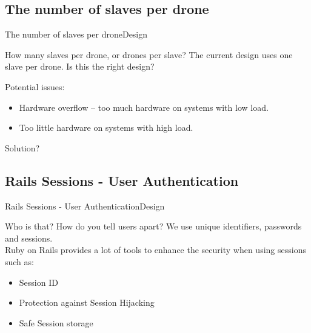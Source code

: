 \subsection{The number of slaves per drone}
\begin{frame}{The number of slaves per drone}{Design}
  \begin{block}{How many slaves per drone, or drones per slave?}
	The current design uses one slave per drone. Is this the right design?

	Potential issues:
	\begin{itemize}
		\item Hardware overflow -- too much hardware on systems with low load.
		\item Too little hardware on systems with high load.
	\end{itemize}

	Solution?
  \end{block}
\end{frame}



\subsection{Rails Sessions - User Authentication}
\begin{frame}{Rails Sessions - User Authentication}{Design}
  \begin{block}{Who is that?}
  	How do you tell users apart? We use unique identifiers, passwords and sessions. \\

  	Ruby on Rails provides a lot of tools to enhance the security when using sessions such as:
  	\begin{itemize}
  		\item Session ID
  		\item Protection against Session Hijacking
  		\item Safe Session storage
  	\end{itemize}
  \end{block}
\end{frame}


